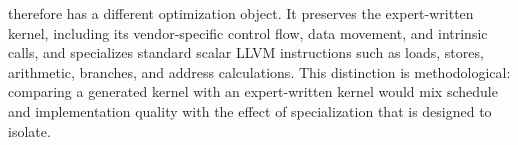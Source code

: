 \mysys therefore has a different optimization object.
It preserves the expert-written kernel, including its vendor-specific control flow, data movement, and intrinsic calls, and specializes standard scalar LLVM instructions such as loads, stores, arithmetic, branches, and address calculations.
This distinction is methodological: comparing a generated kernel with an expert-written kernel would mix schedule and implementation quality with the effect of specialization that \mysys is designed to isolate.
